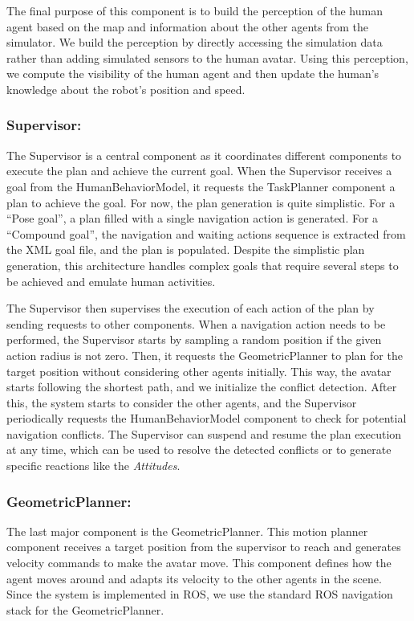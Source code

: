 The final purpose of this component is to build the perception of the human agent based on the map and information about the other agents from the simulator. We build the perception by directly accessing the simulation data rather than adding simulated sensors to the human avatar. Using this perception, we compute the visibility of the human agent and then update the human's knowledge about the robot's position and speed.

\subsubsection{Supervisor:}
The Supervisor is a central component as it coordinates different components to execute the plan and achieve the current goal. When the Supervisor receives a goal from the HumanBehaviorModel, it requests the TaskPlanner component a plan to achieve the goal. For now, the plan generation is quite simplistic. For a ``Pose goal'', a plan filled with a single navigation action is generated. For a ``Compound goal'', the navigation and waiting actions sequence is extracted from the XML goal file, and the plan is populated. Despite the simplistic plan generation, this architecture handles complex goals that require several steps to be achieved and emulate human activities.  

The Supervisor then supervises the execution of each action of the plan by sending requests to other components. 
When a navigation action needs to be performed, the Supervisor starts by sampling a random position if the given action radius is not zero. Then, it requests the GeometricPlanner to plan for the target position without considering other agents initially. This way, the avatar starts following the shortest path, and we initialize the conflict detection. After this, the system starts to consider the other agents, and the Supervisor periodically requests the HumanBehaviorModel component to check for potential navigation conflicts. The Supervisor can suspend and resume the plan execution at any time, which can be used to resolve the detected conflicts or to generate specific reactions like the \textit{Attitudes}.

\subsubsection{GeometricPlanner:}

The last major component is the GeometricPlanner. This motion planner component receives a target position from the supervisor to reach and generates velocity commands to make the avatar move. This component defines how the agent moves around and adapts its velocity to the other agents in the scene. Since the system is implemented in ROS, we use the standard ROS navigation stack for the GeometricPlanner.

